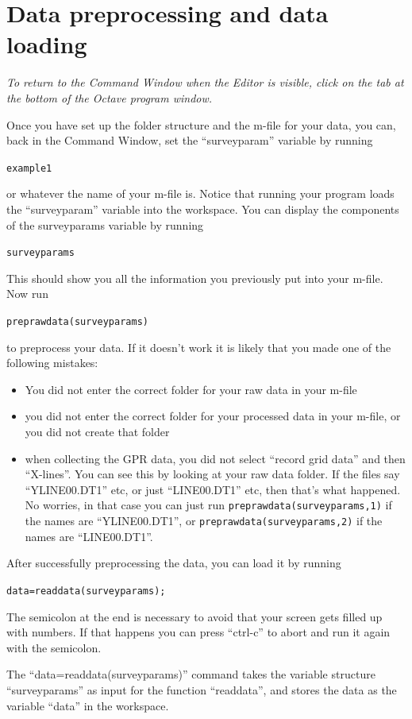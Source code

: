 \documentclass[11pt]{article}
\begin{document}
\section{Data preprocessing and data loading}
\emph{To return to the Command Window when the Editor is visible,
  click on the tab at the bottom of the Octave program window.}

Once you have set up the folder structure and the m-file for your
data, you can, back in the Command Window, set the ``surveyparam''
variable by running

\qquad \verb#example1#

or whatever the name of your m-file is. Notice that running your program
loads the ``surveyparam'' variable into the workspace. You can display the
components of the surveyparams variable by running

\qquad \verb#surveyparams#

This should show you all the information you previously put into your
m-file.  Now run

\qquad \verb#preprawdata(surveyparams)#

to preprocess your data. If it doesn't work it is likely that you made
one of the following mistakes:
\begin{itemize}
\item You did not enter the correct folder for your raw data in your
  m-file
\item you did not enter the correct folder for your processed data in
  your m-file, or you did not create that folder
\item when collecting the GPR data, you did not select ``record grid
  data'' and then ``X-lines''. You can see this by looking at your raw
  data folder. If the files say ``YLINE00.DT1'' etc, or just
  ``LINE00.DT1'' etc, then that's what happened. No worries, in that
  case you can just run \qquad \verb#preprawdata(surveyparams,1)# if
  the names are ``YLINE00.DT1'', or \verb#preprawdata(surveyparams,2)#
  if the names are ``LINE00.DT1''.
\end{itemize}

After successfully preprocessing the data, you can load it by running

\qquad \verb#data=readdata(surveyparams);#

The semicolon at the end is necessary to avoid that your screen gets
filled up with numbers. If that happens you can press ``ctrl-c'' to
abort and run it again with the semicolon.
 
The ``data=readdata(surveyparams)'' command takes the variable structure
``surveyparams'' as input for the function ``readdata'', and stores the 
data as the variable ``data'' in the workspace.
\end{document}
